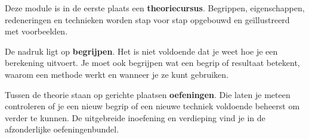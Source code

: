 



Deze module is in de eerste plaats een \textbf{theoriecursus}.
Begrippen, eigenschappen, redeneringen en technieken worden stap voor stap
opgebouwd en geïllustreerd met voorbeelden.

De nadruk ligt op \textbf{begrijpen}.
Het is niet voldoende dat je weet hoe je een berekening uitvoert.
Je moet ook begrijpen wat een begrip of resultaat betekent,
waarom een methode werkt en wanneer je ze kunt gebruiken.

Tussen de theorie staan op gerichte plaatsen \textbf{oefeningen}.
Die laten je meteen controleren of je een nieuw begrip of een nieuwe techniek
voldoende beheerst om verder te kunnen.
De uitgebreide inoefening en verdieping vind je in de afzonderlijke
oefeningenbundel.






